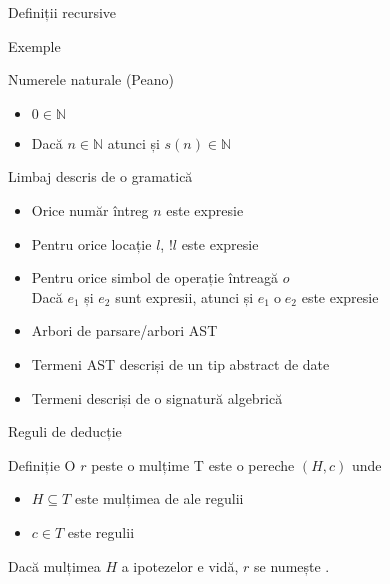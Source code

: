\begin{section}{Definiții recursive}

\begin{frame}{}{Exemple}
  \begin{block}{Numerele naturale (Peano)}
      \begin{itemize}
      \item $0 \in \mathbb{N}$
       \item Dacă $n \in \mathbb{N}$ atunci și $s(n) \in \mathbb{N}$
      \end{itemize}
  \end{block}
  \begin{block}{Limbaj descris de o gramatică \hfill 
\begin{minipage}{.35\columnwidth} \renewcommand{\syntaxKeyword}{}\syntax[\AExp]{\Int\Smid\terminal{!}\Id \Smid \AExp\iop \AExp}{}\end{minipage}}
     \begin{itemize}
	 \item Orice număr întreg $n$ este expresie
         \item Pentru orice locație $l$, $\mathrel{!} l$ este expresie
         \item Pentru orice simbol de operație întreagă $o$\\
              Dacă $e_1$ și $e_2$ sunt expresii, atunci și $e_1 \mathrel{o} e_2$ este expresie
      \end{itemize}
  \end{block}
  \begin{itemize} 
        \item Arbori de parsare/arbori AST
        \item Termeni AST descriși de un tip abstract de date
       \item Termeni descriși de o signatură algebrică
\end{itemize}
\end{frame}

\begin{frame}{Reguli de deducție}
   \begin{block}{Definiție}
        O  $r$ peste o mulțime T este o pereche $(H,c)$ unde 
         \begin{itemize}
             \item $H \subseteq T$ este mulțimea de  ale regulii
             \item $c\in T$ este  regulii
         \end{itemize}         
        Dacă mulțimea $H$ a ipotezelor e vidă, $r$ se numește .


\end{block}
\end{frame}
\end{section}
